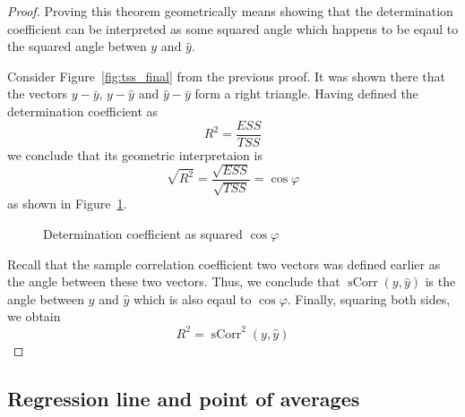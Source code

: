 \documentclass[nobib]{tufte-handout}
\DeclareMathOperator{\sCorr}{sCorr}
\begin{document}
\begin{proof}
Proving this theorem geometrically means showing that the determination coefficient can be interpreted as some squared angle
which happens to be eqaul to the squared angle betwen $y$ and $\hat y$.

Consider Figure~\ref{fig:tss_final} from the previous proof.
It was shown there that the vectors $y - \bar y$, $y - \hat y$ and $\hat y - \bar y$ form a right triangle.
Having defined the determination coefficient as
\[
R^2 = \frac{ESS}{TSS}
\]
we conclude that its geometric interpretaion is
\[
\sqrt{R^2} = \frac{\sqrt{ESS}}{\sqrt{TSS}} = \cos \varphi
\]
as shown in Figure~\ref{fig:r_sq_angle}.

\begin{figure}
  \caption{Determination coefficient as squared $\cos \varphi$}
  \label{fig:r_sq_angle}
\end{figure}

Recall that the sample correlation coefficient two vectors was defined earlier as the angle between these two vectors.
Thus, we conclude that $\sCorr(y, \hat y)$ is the angle between $y$ and $\hat y$ which is also eqaul to $\cos \varphi$.
Finally, squaring both sides, we obtain
\[
R^2 = \sCorr^2(y, \hat y)
\]
\end{proof}

\subsection{Regression line and point of averages}
\end{document}
